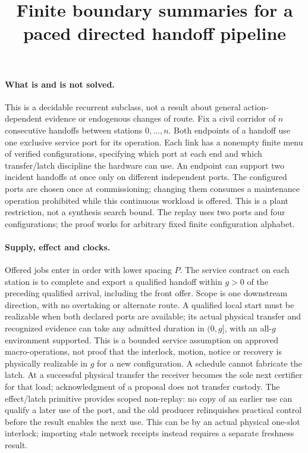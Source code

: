 \documentclass[11pt]{article}
\title{Finite boundary summaries for a paced directed handoff pipeline}
\begin{document}
\maketitle
\paragraph{What is and is not solved.}
This is a decidable recurrent subclass, not a result about
general action-dependent evidence or endogenous changes of
route. Fix a civil corridor of \(n\) consecutive handoffs between
stations \(0,\ldots,n\). Both endpoints of a handoff use
one exclusive service port for its operation. Each link has a
nonempty finite menu of verified configurations, specifying
which port at each end and which transfer/latch discipline the
hardware can use. An endpoint can support two incident handoffs
at once only on different independent ports. The configured
ports are chosen once at commissioning; changing them consumes a
maintenance operation prohibited while this continuous workload
is offered. This is a plant restriction, not a synthesis search
bound. The replay uses two ports and four configurations;
the proof works for arbitrary fixed finite configuration alphabet.

\paragraph{Supply, effect and clocks.}
Offered jobs enter in order with lower spacing \(P\).
The service contract on each station is to complete and export
a qualified handoff within \(g>0\) of the preceding qualified
arrival, including the front offer. Scope is one downstream
direction, with no overtaking or alternate route. A qualified
local start must be realizable when both declared ports are
available; its actual physical transfer and recognized evidence
can take any admitted duration in \((0,g]\), with an all-\(g\)
environment supported. This is a bounded service assumption
on approved macro-operations, not proof that the interlock,
motion, notice or recovery is physically realizable in \(g\)
for a new configuration. A schedule cannot fabricate the latch.
At a successful physical transfer the receiver becomes the sole
next certifier for that load; acknowledgment of a proposal
does not transfer custody. The effect/latch primitive provides
scoped non-replay: no copy of an earlier use can qualify a later
use of the port, and the old producer relinquishes practical
control before the result enables the next use. This can be by
an actual physical one-slot interlock; importing stale network
receipts instead requires a separate freshness result.
\end{document}

